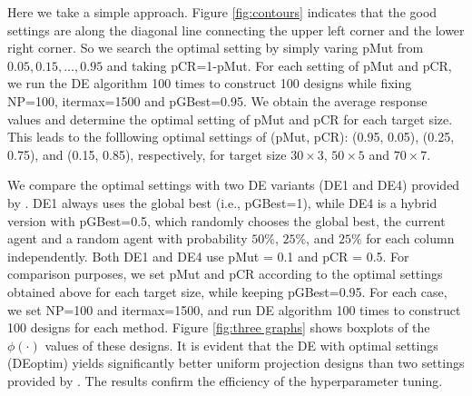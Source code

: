 \documentclass [PhD] {package/uclathes}
\begin{document}

Here we take a simple approach. Figure \ref{fig:contours} indicates that the good settings are along the diagonal line connecting the upper left corner and the lower right corner. So we search the optimal setting by simply varing pMut from $0.05, 0.15, \ldots, 0.95$ and taking pCR=1-pMut.  For each setting of pMut and pCR, we run the DE algorithm 100 times to construct 100 designs while fixing NP=100, itermax=1500 and pGBest=0.95. We obtain the average response values and determine the optimal setting of pMut and pCR for each target size.  This leads to the folllowing optimal settings of (pMut, pCR): (0.95, 0.05), (0.25, 0.75), and (0.15, 0.85), respectively, for target size $30\times3$, $50\times5$ and $70\times7$.

We compare the optimal settings with two DE variants (DE1 and DE4) provided by \textcite{stokes2023metaheuristic}. DE1 always uses the global best (i.e., pGBest=1), while DE4 is a hybrid version with pGBest=0.5, which randomly chooses the global best, the current agent and a random agent with probability $50$\%, $25$\%, and $25$\% for each column independently. {Both DE1 and DE4 use pMut = 0.1 and pCR = 0.5.}
For comparison purposes, we set pMut and pCR according to the optimal settings obtained above for each target size, while keeping pGBest=0.95.  For each case, we set NP=100 and itermax=1500, and run DE algorithm 100 times to construct 100 designs for each method. Figure \ref{fig:three graphs} shows boxplots of the $\phi(\cdot)$ values of these designs. It is evident that the DE with optimal settings (DEoptim) yields significantly better uniform projection designs than two settings provided by \textcite{stokes2023metaheuristic}. The results confirm the efficiency of the hyperparameter tuning.


\end{document}
